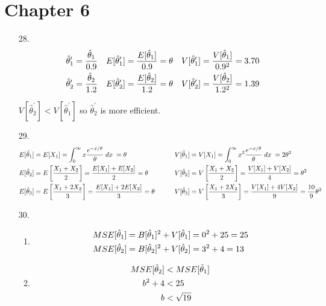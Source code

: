 \documentclass{article}
\def\prm{^\prime}
\def\dx{\; dx \;}
\begin{document}
\noindent
\begin{center}
\end{center}\vspace{0em}


\section*{Chapter 6}
\begin{enumerate}

\item[28.]
\begin{align}
	\hat\theta_1\prm &= \dfrac{\hat\theta_1}{0.9}
	& E[\hat\theta_1\prm] &= \dfrac{E[\hat\theta_1]}{0.9} = \theta
	& V[\hat\theta_1\prm] &= \dfrac{V[\hat\theta_1]}{0.9^2} = 3.70
	\notag\\
	\hat\theta_2\prm &= \dfrac{\hat\theta_2}{1.2}
	& E[\hat\theta_2\prm] &= \dfrac{E[\hat\theta_2]}{1.2} = \theta
	& V[\hat\theta_2\prm] &= \dfrac{V[\hat\theta_2]}{1.2^2} = 1.39
	\notag
\end{align}

$V[\hat\theta_2\prm] < V[\hat\theta_1\prm]$ so $\hat\theta_2\prm$ is more efficient.

\item[29.]
\begin{align}
	E[\hat\theta_1]
		&= E[X_1]
		= \int_0^\infty x \dfrac{e^{-x/\theta}}{\theta} \dx
		= \theta
	& V[\hat\theta_1]
		&= V[X_1]
		= \int_0^\infty x^2 \dfrac{e^{-x/\theta}}{\theta} \dx
		= 2 \theta^2
	\notag\\
	E[\hat\theta_2]
		&= E\left[\dfrac{X_1 + X_2}{2}\right]
		= \dfrac{E[X_1] + E[X_2]}{2}
		= \theta
	&\hspace{2em} V[\hat\theta_2]
		&= V\left[\dfrac{X_1 + X_2}{2}\right]
		= \dfrac{V[X_1] + V[X_2]}{4}
		= \theta^2
	\notag\\
	E[\hat\theta_3]
		&= E\left[\dfrac{X_1 + 2X_2}{3}\right]
		= \dfrac{E[X_1] + 2E[X_2]}{3}
		= \theta
	&\hspace{2em} V[\hat\theta_3]
		&= V\left[\dfrac{X_1 + 2X_2}{3}\right]
		= \dfrac{V[X_1] + 4V[X_2]}{9}
		= \dfrac{10}{9} \theta^2
	\notag
\end{align}

\item[30.]
\begin{enumerate}
\item
\begin{align}
	MSE[\hat\theta_1] &= B[\hat\theta_1]^2 + V[\hat\theta_1] = 0^2 + 25 = 25
	\notag\\
	MSE[\hat\theta_2] &= B[\hat\theta_2]^2 + V[\hat\theta_2] = 3^2 + 4 = 13
	\notag
\end{align}
\item
\begin{align}
	MSE[\hat\theta_2] &< MSE[\hat\theta_1]
	\notag\\
	b^2 + 4 &< 25
	\notag\\
	b &< \sqrt{19}
	\notag
\end{align}
\end{enumerate}


\end{enumerate}
\end{document}
